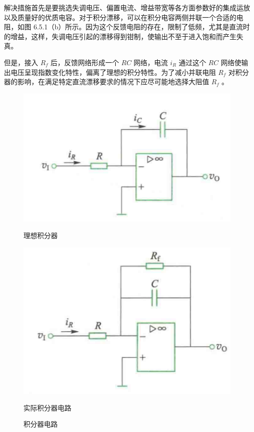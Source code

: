 \documentclass[10pt, a4paper]{article} %
\begin{document}
解决措施首先是要挑选失调电压、偏置电流、增益带宽等各方面参数好的集成运放以及质量好的优质电容。对于积分漂移，可以在积分电容两侧并联一个合适的电阻，如图 6.5.1（b）所示。因为这个反馈电阻的存在，限制了低频，尤其是直流时的增益，这样，失调电压引起的漂移得到钳制，使输出不至于进入饱和而产生失真。

但是，接入  $ R_f $  后，反馈网络形成一个  $ RC $  网络，电流  $ i_R $  通过这个  $ RC $  网络使输出电压呈现指数变化特性，偏离了理想的积分特性。为了减小并联电阻  $ R_f $  对积分器的影响，在满足特定直流漂移要求的情况下应尽可能地选择大阻值  $ R_f $ 。

\begin{figure}[htbp]
    \centering
    \begin{minipage}{0.45\textwidth}
        \centering
        \includegraphics[width=\linewidth]{image/7.png}
        \caption{理想积分器}
        \label{fig:ideal_integrator}
    \end{minipage}\hfill
    \begin{minipage}{0.45\textwidth}
        \centering
        \includegraphics[width=\linewidth]{image/8.png}
        \caption{实际积分器电路}
        \label{fig:actual_integrator}
    \end{minipage}
    \caption{积分器电路}
    \label{fig:integrator}
\end{figure}
\end{document}
